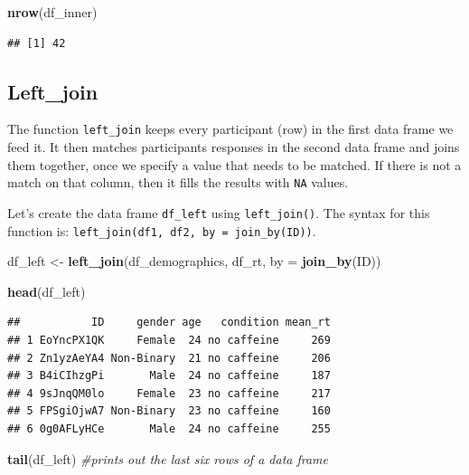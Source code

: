 \documentclass[
]{book}
\newenvironment{Shaded}{\begin{snugshade}}{\end{snugshade}}
\newcommand{\AttributeTok}[1]{\textcolor[rgb]{0.13,0.29,0.53}{#1}}
\newcommand{\CommentTok}[1]{\textcolor[rgb]{0.56,0.35,0.01}{\textit{#1}}}
\newcommand{\FunctionTok}[1]{\textcolor[rgb]{0.13,0.29,0.53}{\textbf{#1}}}
\newcommand{\NormalTok}[1]{#1}
\newcommand{\OtherTok}[1]{\textcolor[rgb]{0.56,0.35,0.01}{#1}}
\begin{document}
\begin{Shaded}
\begin{Highlighting}[]
\FunctionTok{nrow}\NormalTok{(df\_inner)}
\end{Highlighting}
\end{Shaded}

\begin{verbatim}
## [1] 42
\end{verbatim}

\subsection{Left\_join}\label{left_join}

The function \texttt{left\_join} keeps every participant (row) in the first data frame we feed it. It then matches participants responses in the second data frame and joins them together, once we specify a value that needs to be matched. If there is not a match on that column, then it fills the results with \texttt{NA} values.

Let's create the data frame \texttt{df\_left} using \texttt{left\_join()}. The syntax for this function is: \texttt{left\_join(df1,\ df2,\ by\ =\ join\_by(ID))}.

\begin{Shaded}
\begin{Highlighting}[]
\NormalTok{df\_left }\OtherTok{\textless{}{-}} \FunctionTok{left\_join}\NormalTok{(df\_demographics, df\_rt, }\AttributeTok{by =} \FunctionTok{join\_by}\NormalTok{(ID))}


\FunctionTok{head}\NormalTok{(df\_left)}
\end{Highlighting}
\end{Shaded}

\begin{verbatim}
##           ID     gender age   condition mean_rt
## 1 EoYncPX1QK     Female  24 no caffeine     269
## 2 Zn1yzAeYA4 Non-Binary  21 no caffeine     206
## 3 B4iCIhzgPi       Male  24 no caffeine     187
## 4 9sJnqQM0lo     Female  23 no caffeine     217
## 5 FPSgiOjwA7 Non-Binary  23 no caffeine     160
## 6 0g0AFLyHCe       Male  24 no caffeine     255
\end{verbatim}

\begin{Shaded}
\begin{Highlighting}[]
\FunctionTok{tail}\NormalTok{(df\_left) }\CommentTok{\#prints out the last six rows of a data frame}
\end{Highlighting}
\end{Shaded}
\end{document}
